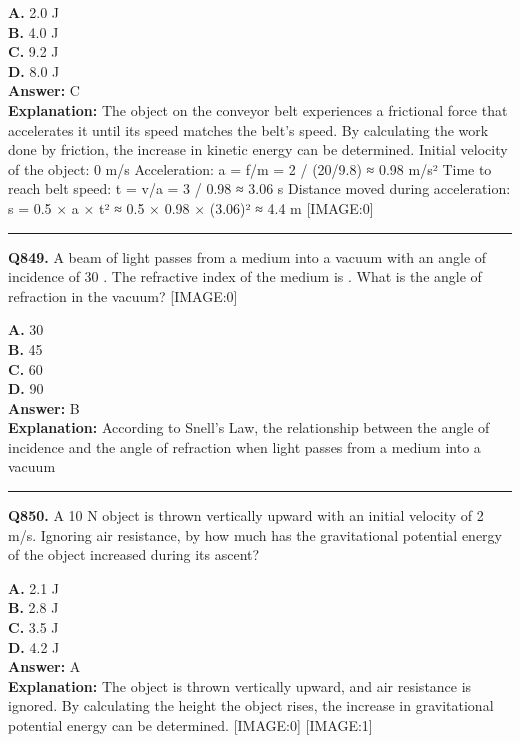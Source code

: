 \documentclass[12pt]{article}
\begin{document}
\textbf{A.} 2.0 J \\
\textbf{B.} 4.0 J \\
\textbf{C.} 9.2 J \\
\textbf{D.} 8.0 J \\

\textbf{Answer:} C \\
\textbf{Explanation:} The object on the conveyor belt experiences a frictional force that accelerates it until its speed matches the belt's speed. By calculating the work done by friction, the increase in kinetic energy can be determined.
Initial velocity of the object: 0 m/s
Acceleration: a = f/m = 2 / (20/9.8) ≈ 0.98 m/s²
Time to reach belt speed: t = v/a = 3 / 0.98 ≈ 3.06 s
Distance moved during acceleration: s = 0.5 × a × t² ≈ 0.5 × 0.98 × (3.06)² ≈ 4.4 m
[IMAGE:0]

\hrule
\vspace{1em}


\noindent
\textbf{Q849.} A beam of light passes from a medium into a vacuum with an angle of incidence of 30
\circ 
. The refractive index of the medium is
. What is the angle of refraction in the vacuum?
[IMAGE:0]



\textbf{A.} 30
\circ  \\
\textbf{B.} 45
\circ  \\
\textbf{C.} 60
\circ  \\
\textbf{D.} 90
\circ  \\

\textbf{Answer:} B \\
\textbf{Explanation:} According to Snell's Law, the relationship between the angle of incidence and the angle of refraction when light passes from a medium into a vacuum

\hrule
\vspace{1em}


\noindent
\textbf{Q850.} A 10 N object is thrown vertically upward with an initial velocity of 2 m/s. Ignoring air resistance, by how much has the gravitational potential energy of the object increased during its ascent?



\textbf{A.} 2.1 J \\
\textbf{B.} 2.8 J \\
\textbf{C.} 3.5 J \\
\textbf{D.} 4.2 J \\

\textbf{Answer:} A \\
\textbf{Explanation:} The object is thrown vertically upward, and air resistance is ignored. By calculating the height the object rises, the increase in gravitational potential energy can be determined.
[IMAGE:0]
[IMAGE:1]
\end{document}
